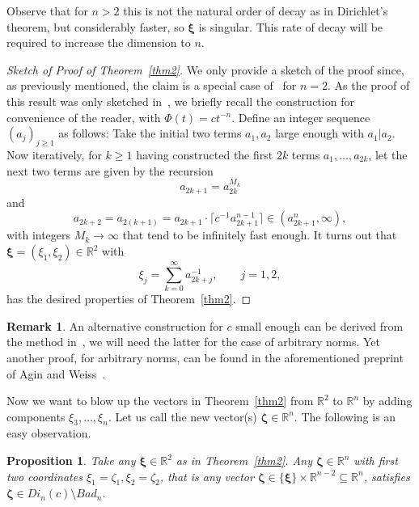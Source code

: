 \documentclass[10pt]{amsart}
\newtheorem{proposition}{Proposition}
\theoremstyle{definition}
\newtheorem{remark}{Remark}
\newcommand{\ux}{\boldsymbol{\xi}}
\newcommand{\uz}{\boldsymbol{\zeta}}
\newcommand{\R}{\mathbb{R}}
\begin{document}
Observe that for $n>2$ this is not the natural order of 
decay as in Dirichlet's theorem, but considerably faster, so $\ux$ is singular.
This rate of decay will be required to increase the dimension to $n$.


\begin{proof}[Sketch of Proof of Theorem~\ref{thm2}]
We only provide a sketch of the proof since, as previously mentioned, the claim is a special case of~\cite[Theorem~1.1]{j2} for $n=2$. 
As the proof of this result was only sketched in~\cite{j2}, we briefly recall the construction for convenience of the reader, with $\Phi(t)=ct^{-n}$.
Define an integer sequence $(a_j)_{j\ge 1}$ as follows: Take
the initial two terms $a_1, a_2$ large enough with $a_1|a_2$. Now iteratively,
for $k\geq 1$ having constructed the first $2k$ terms $a_1,\ldots,a_{2k}$, let
the next two terms are given by the recursion
\begin{equation*} 
a_{2k+1}= a_{2k}^{M_k}
\end{equation*}
and 
\begin{equation*} 
a_{2k+2}=a_{2(k+1)}= a_{2k+1}\cdot \lceil c^{-1}a_{2k+1}^{n-1}\rceil\in (a_{2k+1}^n,\infty),
\end{equation*}
with integers $M_k\to\infty$ that tend to be infinitely fast enough. It turns 
out that $\ux=(\xi_1,\xi_2)\in \R^{2}$ with 
\[
\xi_j= \sum_{k=0}^{\infty} a_{2k+j}^{-1}, \qquad j=1,2,
\]
has the desired properties of Theorem~\ref{thm2}.
\end{proof}
\begin{remark}
An alternative construction for $c$ small enough can be derived from the method in~\cite{j3}, we will need the latter for the case of arbitrary norms. Yet another proof, for arbitrary norms, can be found in the aforementioned preprint of Agin and Weiss~\cite{AginWeiss2024}.
\end{remark} 


Now we want to blow up the vectors in Theorem~\ref{thm2} from $\R^2$ to $\R^n$ by adding components $\xi_3,\ldots,\xi_n$. Let us call the new vector(s) $\uz\in\R^n$. The following is an easy observation.

\begin{proposition}  \label{pro}
	Take any $\ux\in\R^2$ as in Theorem~\ref{thm2}. 
	Any $\uz\in\R^n$ with first two coordinates $\xi_1=\zeta_1, \xi_2=\zeta_2$,
	that is any vector $\uz\in \{ \ux\}\times \R^{n-2}\subseteq \R^n$, 
	satisfies $\uz\in Di_n(c)\setminus Bad_n$. 
\end{proposition}
\end{document}
